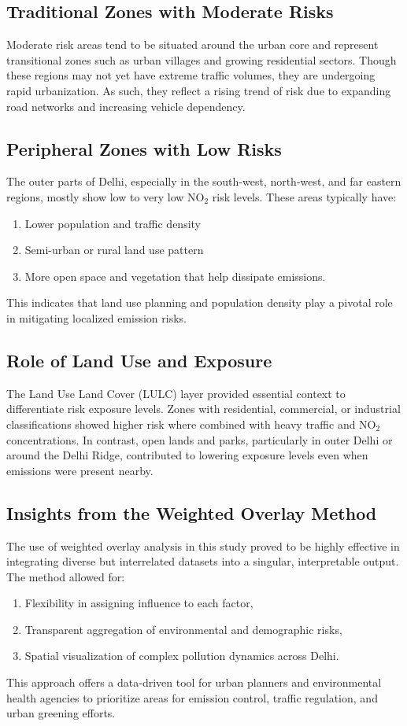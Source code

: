 \documentclass[12pt]{report}
\begin{document}
\subsection{Traditional Zones with Moderate Risks}
Moderate risk areas tend to be situated around the urban core and represent transitional zones such as urban villages and growing residential sectors. Though these regions may not yet have extreme traffic volumes, they are undergoing rapid urbanization. As such, they reflect a rising trend of risk due to expanding road networks and increasing vehicle dependency.

\subsection{Peripheral Zones with Low Risks}
The outer parts of Delhi, especially in the south-west, north-west, and far eastern regions, mostly show low to very low NO$_2$ risk levels. These areas typically have:
\begin{enumerate}
    \item Lower population and traffic density
    \item Semi-urban or rural land use pattern
    \item More open space and vegetation that help dissipate emissions.
\end{enumerate}
This indicates that land use planning and population density play a pivotal role in mitigating localized emission risks.

\subsection{Role of Land Use and Exposure}
The Land Use Land Cover (LULC) layer provided essential context to differentiate risk exposure levels. Zones with residential, commercial, or industrial classifications showed higher risk where combined with heavy traffic and NO$_2$ concentrations. In contrast, open lands and parks, particularly in outer Delhi or around the Delhi Ridge, contributed to lowering exposure levels even when emissions were present nearby.

\subsection{Insights from the Weighted Overlay Method}
The use of weighted overlay analysis in this study proved to be highly effective in integrating diverse but interrelated datasets into a singular, interpretable output. The method allowed for:
\begin{enumerate}
    \item Flexibility in assigning influence to each factor,
    \item Transparent aggregation of environmental and demographic risks,
    \item Spatial visualization of complex pollution dynamics across Delhi.
\end{enumerate}
This approach offers a data-driven tool for urban planners and environmental health agencies to prioritize areas for emission control, traffic regulation, and urban greening efforts.
\end{document}
